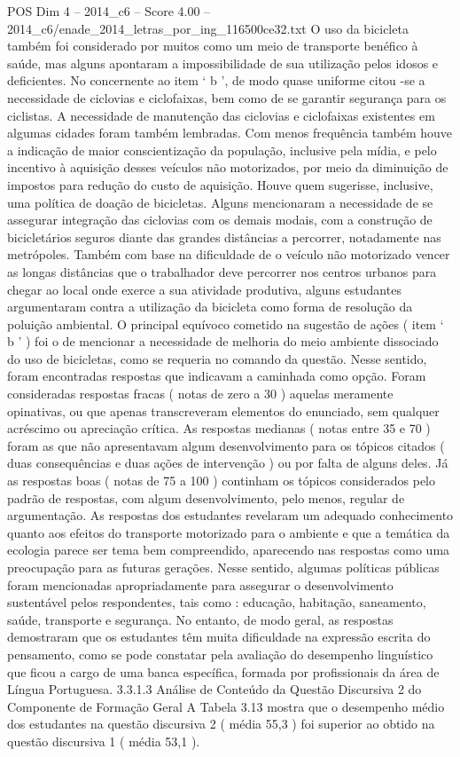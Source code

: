 \begin{textsample}{POS Dim 4 – 2014\_c6 – Score 4.00 – 2014\_c6/enade\_2014\_letras\_por\_ing\_116500ce32.txt}
O uso da bicicleta também foi considerado por muitos como um meio de transporte benéfico à saúde, mas alguns apontaram a impossibilidade de sua utilização pelos idosos e deficientes.
No concernente ao item ‘ b ’, de modo quase uniforme citou -se a necessidade de ciclovias e ciclofaixas, bem como de se garantir segurança para os ciclistas.
A necessidade de manutenção das ciclovias e ciclofaixas existentes em algumas cidades foram também lembradas.
Com menos frequência também houve a indicação de maior conscientização da população, inclusive pela mídia, e pelo incentivo à aquisição desses veículos não motorizados, por meio da diminuição de impostos para redução do custo de aquisição.
Houve quem sugerisse, inclusive, uma política de doação de bicicletas.
Alguns mencionaram a necessidade de se assegurar integração das ciclovias com os demais modais, com a construção de bicicletários seguros diante das grandes distâncias a percorrer, notadamente nas metrópoles.
Também com base na dificuldade de o veículo não motorizado vencer as longas distâncias que o trabalhador deve percorrer nos centros urbanos para chegar ao local onde exerce a sua atividade produtiva, alguns estudantes argumentaram contra a utilização da bicicleta como forma de resolução da poluição ambiental.
O principal equívoco cometido na sugestão de ações ( item ‘ b ’ ) foi o de mencionar a necessidade de melhoria do meio ambiente dissociado do uso de bicicletas, como se requeria no comando da questão.
Nesse sentido, foram encontradas respostas que indicavam a caminhada como opção.
Foram consideradas respostas fracas ( notas de zero a 30 ) aquelas meramente opinativas, ou que apenas transcreveram elementos do enunciado, sem qualquer acréscimo ou apreciação crítica.
As respostas medianas ( notas entre 35 e 70 ) foram as que não apresentavam algum desenvolvimento para os tópicos citados ( duas consequências e duas ações de intervenção ) ou por falta de alguns deles.
Já as respostas boas ( notas de 75 a 100 ) continham os tópicos considerados pelo padrão de respostas, com algum desenvolvimento, pelo menos, regular de argumentação.
As respostas dos estudantes revelaram um adequado conhecimento quanto aos efeitos do transporte motorizado para o ambiente e que a temática da ecologia parece ser tema bem compreendido, aparecendo nas respostas como uma preocupação para as futuras gerações.
Nesse sentido, algumas políticas públicas foram mencionadas apropriadamente para assegurar o desenvolvimento sustentável pelos respondentes, tais como : educação, habitação, saneamento, saúde, transporte e segurança.
No entanto, de modo geral, as respostas demostraram que os estudantes têm muita dificuldade na expressão escrita do pensamento, como se pode constatar pela avaliação do desempenho linguístico que ficou a cargo de uma banca específica, formada por profissionais da área de Língua Portuguesa. 3.3.1.3 Análise de Conteúdo da Questão Discursiva 2 do Componente de Formação Geral A Tabela 3.13 mostra que o desempenho médio dos estudantes na questão discursiva 2 ( média 55,3 ) foi superior ao obtido na questão discursiva 1 ( média 53,1 ).

\end{textsample}
